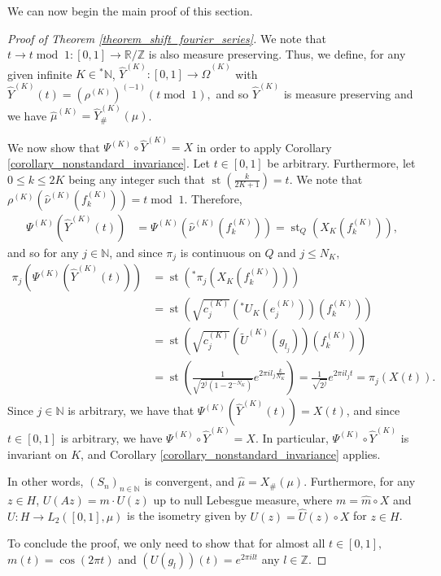\documentclass[10pt,a4paper]{amsart}
\def \St{\operatorname{st}}
\def \HOM{\hat{\Omega}}
\def \HMU{\hat{\mu}}
\def \HNU{\hat{\nu}}
\def \HU{\hat{U}}
\def \Hm{\hat{m}}
\begin{document}
We can now begin the main proof of this section.

\begin{proof}[Proof of Theorem \ref{theorem_shift_fourier_series}]
	We note that $t\rightarrow t\operatorname{mod}\;1: [0,1]\rightarrow \mathbb{R}/\mathbb{Z}$ is also measure preserving. Thus, we define, for any given infinite $K\in{}^*\mathbb{N}$, $\hat{Y}^{(K)}:[0,1]\rightarrow \HOM^{(K)}$ with $\hat{Y}^{(K)}(t)=(\rho^{(K)})^{(-1)}(t\operatorname{mod}\;1),$  and so $\hat{Y}^{(K)}$ is measure preserving and we have $\HMU^{(K)}=\hat{Y}^{(K)}_{\#}(\mu)$.
	
	We now show that $\Psi^{(K)}\circ \hat{Y}^{(K)}=X$ in order to apply Corollary \ref{corollary_nonstandard_invariance}. Let $t\in[0,1]$ be arbitrary.  Furthermore, let $0\leq k\leq 2K$ being any integer such that $\St(\frac{k}{2K+1})=t$. We note that $\rho^{(K)}(\HNU^{(K)}(f_k^{(K)}))=t\operatorname{mod}\;1.$ Therefore,
	\begin{align*}
		\Psi^{(K)}(\hat{Y}^{(K)}(t))&=\Psi^{(K)}(\HNU^{(K)}(f_k^{(K)}))=\St_Q(X_K(f_k^{(K)})),
	\end{align*}
	and so for any $j\in\mathbb{N}$, and since $\pi_j$ is continuous on $Q$ and $j\leq N_K,$
	\begin{align*}
		\pi_j(\Psi^{(K)}(\hat{Y}^{(K)}(t)))&=\St({}^*\pi_j(X_K(f_k^{(K)})))\\
		&=\St\left(\sqrt{c_j^{(K)}}\left({}^*U_K(e_j^{(K)})\right)(f_k^{(K)})\right)\\	&=\St\left(\sqrt{c_j^{(K)}}\left(\tilde{U}^{(K)}(g_{l_j})\right)(f_k^{(K)})\right)\\
		&=\St\left(\frac{1}{\sqrt{2^j(1-2^{-N_K})}}e^{2\pi il_j \frac{k}{N_K}}\right)=\frac{1}{\sqrt{2^j}}e^{2\pi i l_j t}=\pi_j(X(t)).
	\end{align*}
	Since $j\in\mathbb{N}$ is arbitrary, we have that $\Psi^{(K)}(\hat{Y}^{(K)}(t))=X(t)$, and since $t\in[0,1]$ is arbitrary, we have $\Psi^{(K)}\circ \hat{Y}^{(K)}=X$. In particular, $\Psi^{(K)}\circ \hat{Y}^{(K)}$ is invariant on $K$, and Corollary \ref{corollary_nonstandard_invariance} applies.
	
	In other words, $(S_n)_{n\in\mathbb{N}}$ is convergent, and $\HMU=X_{\#}(\mu)$. Furthermore, for any $z\in H$, $U(Az)=m\cdot U(z)$ up to null Lebesgue measure, where $m=\Hm\circ X$  and $U:H\rightarrow L_2([0,1],\mu)$ is the isometry given by $U(z)=\HU(z)\circ X$ for $z\in H$. 
	
	To conclude the proof, we only need to show that for almost all $t\in[0,1],$ $m(t)=\cos(2\pi t)$ and $(U(g_l))(t)=e^{2\pi il t}$  any $l\in\mathbb{Z}$.
	

\end{proof}
\end{document}
